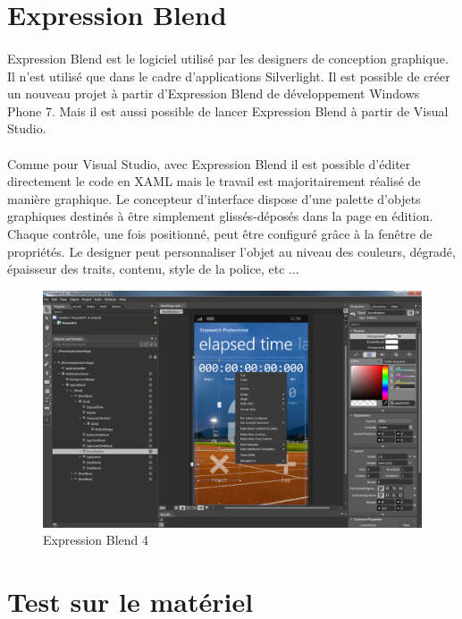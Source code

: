 \documentclass[twoside,UTF8]{EPURapport}
\begin{document}
	\section{Expression Blend}
	
\paragraph{}
Expression Blend est le logiciel utilisé par les designers de conception graphique. Il n'est utilisé que dans le cadre d'applications Silverlight. Il est possible de créer un nouveau projet à partir d'Expression Blend de développement Windows Phone 7. Mais il est aussi possible de lancer Expression Blend à partir de Visual Studio.

\paragraph{}
Comme pour Visual Studio, avec Expression Blend il est possible d'éditer directement le code en XAML mais le travail est majoritairement réalisé de manière graphique. Le concepteur d'interface dispose d'une palette d'objets graphiques destinés à être simplement glissés-déposés dans la page en édition. Chaque contrôle, une fois positionné, peut être configuré grâce à la fenêtre de propriétés. Le designer peut personnaliser l'objet au niveau des couleurs, dégradé, épaisseur des traits, contenu, style de la police, etc ...
	
	\begin{figure}[H]	
		\center
		\includegraphics[scale=0.5]{images/expressionblend.png}		
		\caption{Expression Blend 4}
	\end{figure}

	\section{Test sur le matériel}
\end{document}
